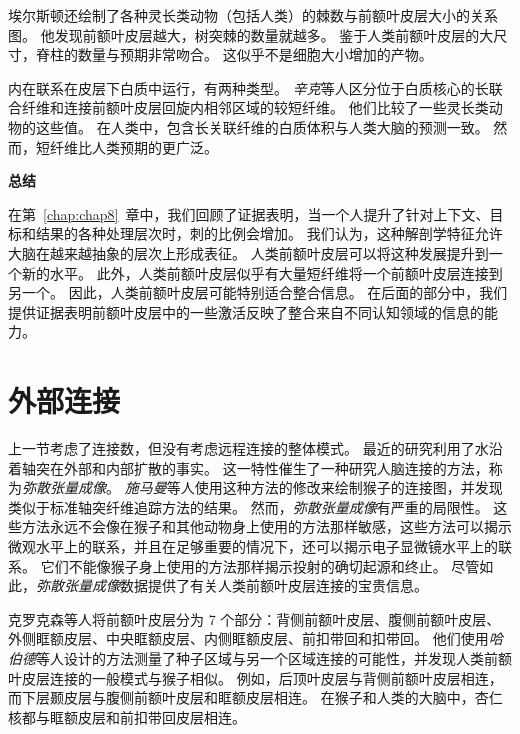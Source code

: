 埃尔斯顿\cite{elston2007specialization}还绘制了各种灵长类动物（包括人类）的棘数与前额叶皮层大小的关系图。
他发现前额叶皮层越大，树突棘的数量就越多。
鉴于人类前额叶皮层的大尺寸，脊柱的数量与预期非常吻合。
这似乎不是细胞大小增加的产物。
\par


内在联系在皮层下白质中运行，有两种类型。
\textit{辛克}等人\cite{schenker2005neural}区分位于白质核心的长联合纤维和连接前额叶皮层回旋内相邻区域的较短纤维。
他们比较了一些灵长类动物的这些值。
在人类中，包含长关联纤维的白质体积与人类大脑的预测一致。
然而，短纤维比人类预期的更广泛。
\par



\textbf{总结}
\par

在第~\ref{chap:chap8}~章中，我们回顾了证据表明，当一个人提升了针对上下文、目标和结果的各种处理层次时，刺的比例会增加。
我们认为，这种解剖学特征允许大脑在越来越抽象的层次上形成表征。
人类前额叶皮层可以将这种发展提升到一个新的水平。
此外，人类前额叶皮层似乎有大量短纤维将一个前额叶皮层连接到另一个。
因此，人类前额叶皮层可能特别适合整合信息。
在后面的部分中，我们提供证据表明前额叶皮层中的一些激活反映了整合来自不同认知领域的信息的能力。



\section{外部连接}

上一节考虑了连接数，但没有考虑远程连接的整体模式。
最近的研究利用了水沿着轴突在外部和内部扩散的事实。
这一特性催生了一种研究人脑连接的方法，称为\textit{弥散张量成像}。
\textit{施马曼}等人\cite{schmahmann2007association}使用这种方法的修改来绘制猴子的连接图，并发现类似于标准轴突纤维追踪方法的结果。
然而，\textit{弥散张量成像}有严重的局限性。
这些方法永远不会像在猴子和其他动物身上使用的方法那样敏感，这些方法可以揭示微观水平上的联系，并且在足够重要的情况下，还可以揭示电子显微镜水平上的联系。
它们不能像猴子身上使用的方法那样揭示投射的确切起源和终止。
尽管如此，\textit{弥散张量成像}数据提供了有关人类前额叶皮层连接的宝贵信息。
\par


克罗克森等人\cite{croxson2005quantitative}将前额叶皮层分为 7 个部分：背侧前额叶皮层、腹侧前额叶皮层、外侧眶额皮层、中央眶额皮层、内侧眶额皮层、前扣带回和扣带回。
他们使用\textit{哈伯德}等人\cite{hubbard2005interactions}设计的方法测量了种子区域与另一个区域连接的可能性，并发现人类前额叶皮层连接的一般模式与猴子相似。
例如，后顶叶皮层与背侧前额叶皮层相连，而下层颞皮层与腹侧前额叶皮层和眶额皮层相连。
在猴子和人类的大脑中，杏仁核都与眶额皮层和前扣带回皮层相连。
\par


